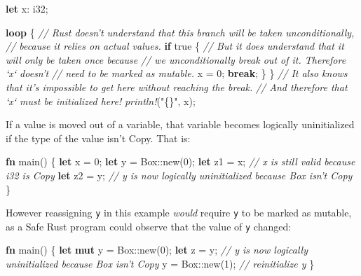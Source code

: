 \documentclass[a4paper,]{book}
\newenvironment{Shaded}{\begin{snugshade}}{\end{snugshade}}
\newcommand{\KeywordTok}[1]{\textcolor[rgb]{0.13,0.29,0.53}{\textbf{{#1}}}}
\newcommand{\DataTypeTok}[1]{\textcolor[rgb]{0.13,0.29,0.53}{{#1}}}
\newcommand{\DecValTok}[1]{\textcolor[rgb]{0.00,0.00,0.81}{{#1}}}
\newcommand{\ConstantTok}[1]{\textcolor[rgb]{0.00,0.00,0.00}{{#1}}}
\newcommand{\StringTok}[1]{\textcolor[rgb]{0.31,0.60,0.02}{{#1}}}
\newcommand{\CommentTok}[1]{\textcolor[rgb]{0.56,0.35,0.01}{\textit{{#1}}}}
\newcommand{\PreprocessorTok}[1]{\textcolor[rgb]{0.56,0.35,0.01}{\textit{{#1}}}}
\newcommand{\NormalTok}[1]{{#1}}
\begin{document}
\begin{Shaded}
\begin{Highlighting}[]
\KeywordTok{let} \NormalTok{x: }\DataTypeTok{i32}\NormalTok{;}

\KeywordTok{loop} \NormalTok{\{}
    \CommentTok{// Rust doesn't understand that this branch will be taken unconditionally,}
    \CommentTok{// because it relies on actual values.}
    \KeywordTok{if} \ConstantTok{true} \NormalTok{\{}
        \CommentTok{// But it does understand that it will only be taken once because}
        \CommentTok{// we unconditionally break out of it. Therefore `x` doesn't}
        \CommentTok{// need to be marked as mutable.}
        \NormalTok{x = }\DecValTok{0}\NormalTok{;}
        \KeywordTok{break}\NormalTok{;}
    \NormalTok{\}}
\NormalTok{\}}
\CommentTok{// It also knows that it's impossible to get here without reaching the break.}
\CommentTok{// And therefore that `x` must be initialized here!}
\PreprocessorTok{println!}\NormalTok{(}\StringTok{"\{\}"}\NormalTok{, x);}
\end{Highlighting}
\end{Shaded}

If a value is moved out of a variable, that variable becomes logically
uninitialized if the type of the value isn't Copy. That is:

\begin{Shaded}
\begin{Highlighting}[]
\KeywordTok{fn} \NormalTok{main() \{}
    \KeywordTok{let} \NormalTok{x = }\DecValTok{0}\NormalTok{;}
    \KeywordTok{let} \NormalTok{y = }\DataTypeTok{Box}\NormalTok{::new(}\DecValTok{0}\NormalTok{);}
    \KeywordTok{let} \NormalTok{z1 = x; }\CommentTok{// x is still valid because i32 is Copy}
    \KeywordTok{let} \NormalTok{z2 = y; }\CommentTok{// y is now logically uninitialized because Box isn't Copy}
\NormalTok{\}}
\end{Highlighting}
\end{Shaded}

However reassigning \texttt{y} in this example \emph{would} require
\texttt{y} to be marked as mutable, as a Safe Rust program could observe
that the value of \texttt{y} changed:

\begin{Shaded}
\begin{Highlighting}[]
\KeywordTok{fn} \NormalTok{main() \{}
    \KeywordTok{let} \KeywordTok{mut} \NormalTok{y = }\DataTypeTok{Box}\NormalTok{::new(}\DecValTok{0}\NormalTok{);}
    \KeywordTok{let} \NormalTok{z = y; }\CommentTok{// y is now logically uninitialized because Box isn't Copy}
    \NormalTok{y = }\DataTypeTok{Box}\NormalTok{::new(}\DecValTok{1}\NormalTok{); }\CommentTok{// reinitialize y}
\NormalTok{\}}
\end{Highlighting}
\end{Shaded}
\end{document}
